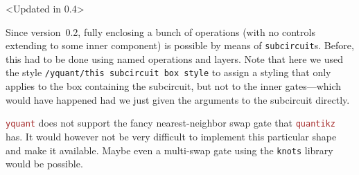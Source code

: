\documentclass{scrartcl}
\makeatletter
\newenvironment{codeexample*}{%
   \VerbatimEnvironment%
   \let\FVB@VerbatimOut\minted@FVB@VerbatimOut
   \let\FVE@VerbatimOut\minted@FVE@VerbatimOut
   \minted@configlang{tex}%
   \minted@fvset
   \begin{VerbatimOut}[codes={\catcode`\^^I=12},firstline,lastline]{\minted@jobname.pyg}%
}{
   \end{VerbatimOut}%
   \minted@langlinenoson%
   \begin{adjustbox}{center}
       \minted@jobname.pyg %
   \end{adjustbox}\nopagebreak
   \expandafter\minted@pygmentize\expandafter{\minted@lang}%
   \minted@langlinenosoff%
   \par%
}
\def\pkg#1{\textcolor{brown}{\texttt{#1}}}
\def\ttlink{\link\texttt}
\def\Yquant{\pkg{yquant}}
\makeatother
\begin{document}
               \begin{example}<Updated in 0.4>
                  \begin{codeexample*}
                  \end{codeexample*}
                  Since version~0.2, fully enclosing a bunch of operations (with no controls extending to some inner component) is possible by means of \ttlink{subcircuit}s.
                  Before, this had to be done using named operations and layers.
                  Note that here we used the style \ttlink{/yquant/this subcircuit box style} to assign a styling that only applies to the box containing the subcircuit, but not to the inner gates---which would have happened had we just given the arguments to the subcircuit directly.
               \end{example}

               \Yquant{} does not support the fancy nearest\hyp neighbor swap gate that \pkg{quantikz} has.
               It would however not be very difficult to implement this particular shape and make it available.
               Maybe even a multi\hyp swap gate using the \texttt{knots} library would be possible.

         \clearpage
\end{document}
